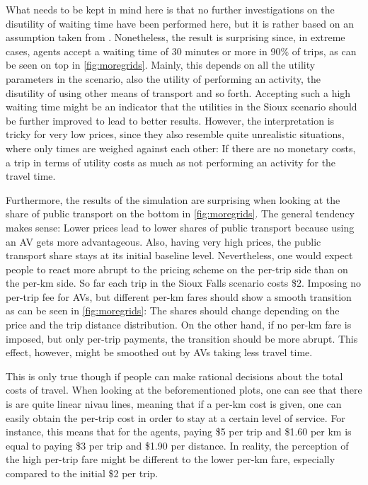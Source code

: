 What needs to be kept in mind here is that no further investigations on the
disutility of waiting time have been performed here, but it is rather based on an
assumption taken from \citet{Chakirov2014}. Nonetheless, the result is surprising
since, in extreme cases, agents accept a waiting time of 30 minutes or more in
90\% of trips, as can be seen on top in \cref{fig:moregrids}. Mainly, this depends
on all the utility parameters in the scenario, also the utility of performing an
activity, the disutility of using other means of transport and so forth. Accepting
such a high waiting time might be an indicator that the utilities in the Sioux
scenario should be further improved to lead to better results. However, the interpretation
is tricky for very low prices, since they also resemble quite unrealistic situations, where
only times are weighed against each other: If there are no monetary costs, a trip
in terms of utility costs as much as not performing an activity for the travel time.

Furthermore, the results of the simulation are surprising when looking at the share
of public transport on the bottom in \cref{fig:moregrids}. The general tendency makes
sense: Lower prices lead to lower shares of public transport because using an AV
gets more advantageous. Also, having very high prices, the public transport share
stays at its initial baseline level. Nevertheless, one would expect people to
react more abrupt to the pricing scheme on the per-trip side than on the per-km
side. So far each trip in the Sioux Falls scenario costs \$2. Imposing no per-trip
fee for AVs, but different per-km fares should show a smooth transition as can be seen
in \cref{fig:moregrids}: The shares
should change depending on the price and the trip distance distribution.
On the other hand, if no per-km fare is imposed, but only per-trip payments, the
transition should be more abrupt. This effect, however, might be smoothed out by
AVs taking less travel time.

This is only true though if people can make rational decisions about the
total costs of travel. When looking at the beforementioned plots, one can see
that there is are quite linear nivau lines, meaning that if a per-km cost is given,
one can easily obtain the per-trip cost in order to stay at a certain level of
service. For instance, this means that for the agents, paying \$5 per trip and
\$1.60 per km is equal to paying \$3 per trip and \$1.90 per distance. In reality, the perception of the high per-trip fare might be different to the lower
per-km fare, especially compared to the initial \$2 per trip.

